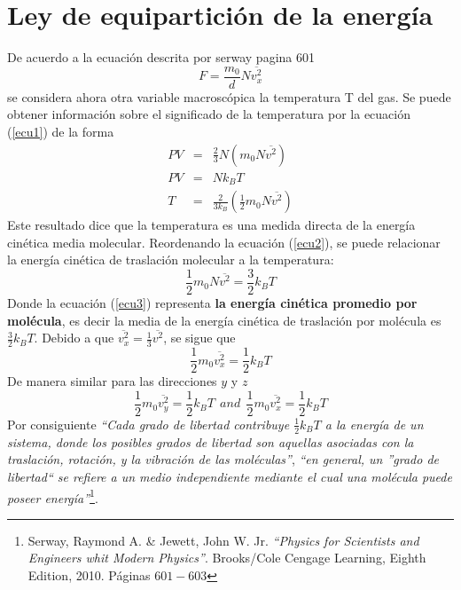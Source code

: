 \documentclass[11pt,graphicx,caption,rotating]{article}
\author{David Ricardo Martínez Hernández Código: $261931$}
\begin{document}
\date{}
\maketitle

\section{Ley de equipartición de la energía}
\noindent
De acuerdo a la ecuación descrita por serway pagina 601
\begin{equation}
 F = \frac{{m_0 }}{d}N\overline {v_x ^2 } 
\label{ecu1}
\end{equation}
\noindent
se considera ahora otra variable macroscópica la temperatura T del gas. Se puede obtener información sobre el significado de la temperatura por la ecuación (\ref{ecu1}) de la forma
\begin{eqnarray}
 PV & = & \frac{2}{3}N \left( {m_0 N\overline {v^2 } } \right) \nonumber \\
 PV & = & Nk_B T \nonumber \\
 T & = & \frac{2}{3 k_B}\left( {\frac{1}{2} m_0 N\overline {v^2 } } \right)\label{ecu2}
\end{eqnarray}
\noindent
Este resultado dice que la temperatura es una medida directa de la energía cinética media molecular. Reordenando la ecuación (\ref{ecu2}), se puede relacionar la energía cinética de traslación molecular a la temperatura:
\begin{equation}
 \frac{1}{2} m_0 N\overline {v^2 } = \frac{3}{2} k_B T
\label{ecu3}
\end{equation}
\noindent
Donde la ecuación (\ref{ecu3}) representa \textbf{la energía cinética promedio por molécula}, es decir la media de la energía cinética de traslación por molécula es $\frac{3}{2}k_B T$. Debido a que $\overline {v_x ^2 }  = \frac{1}{3}\overline {v^2 } $, se sigue que
\begin{equation}
 \frac{1}{2} m_0 \overline {v_x ^2 }=\frac{1}{2} k_B T
\label{ecu4}
\end{equation}
\noindent
De manera similar para las direcciones $y$ y $z$
\begin{equation*}
 \frac{1}{2} m_0 \overline {v_y ^2 }=\frac{1}{2} k_B T\ \ and \ \ \frac{1}{2} m_0 \overline {v_x ^2 }=\frac{1}{2} k_B T
\end{equation*}
\noindent
Por consiguiente \textit{``Cada grado de libertad contribuye $\frac{1}{2}k_B T$ a la energía de un sistema, donde los posibles grados de libertad son aquellas asociadas con la traslación, rotación, y la vibración de las moléculas''}, \textit{``en general, un ''grado de libertad`` se refiere a un medio independiente mediante el cual una molécula puede poseer energía''}\footnote{\cite{serway} Serway, Raymond A. \& Jewett, John W. Jr. {\em "`Physics for Scientists and Engineers whit Modern Physics"'}. Brooks/Cole Cengage Learning, Eighth Edition, 2010. Páginas $601-603$}.\\
\end{document}
